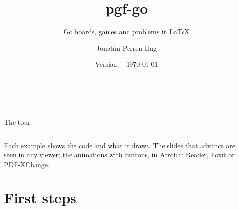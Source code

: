 \documentclass[aspectratio = 169, 10pt]{beamer}
\title{pgf-go}
\subtitle{Go boards, games and problems in LaTeX}
\author{Jonatán Perren Hug}
\date{Version \version\ \textperiodcentered\ \today}
\begin{document}

\begin{frame}[plain]
	\begin{columns}[c]
			{\color{walnut}\inserttitle\par}
			\medskip
			{\large\insertsubtitle\par}
			\bigskip
			{\color{wood}\rule{0.8\linewidth}{1.5pt}}\par
			\medskip
			\insertauthor\par
			\smallskip
			{\small\color{walnut}\insertdate\par}
			\centering
			\begin{goban}[sgf size = lee, profile = shell, scale = 0.52, captures]
			\end{goban}
	\end{columns}
\end{frame}

\begin{frame}{The tour}
	\begin{columns}[t]
			\tableofcontents[sections = {1-6}]
			\tableofcontents[sections = {7-12}]
	\end{columns}
	\vfill
	\small\color{walnut!80}
	Each example shows the code and what it draws. The slides that advance are seen in any viewer; the
	animations with buttons, in Acrobat Reader, Foxit or PDF-XChange.
\end{frame}



\section{First steps}
\end{document}
